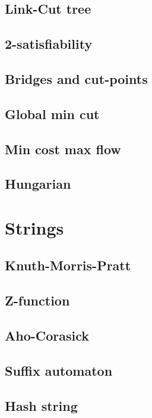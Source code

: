 \documentclass[11pt]{article}
\begin{document}
\subsection{Link-Cut tree}

\subsection{2-satisfiability}

\subsection{Bridges and cut-points}

\subsection{Global min cut}

\subsection{Min cost max flow}

\subsection{Hungarian}


\section{Strings}
\subsection{Knuth-Morris-Pratt}

\subsection{Z-function}

\subsection{Aho-Corasick}

\subsection{Suffix automaton}

\subsection{Hash string}

\end{document}

